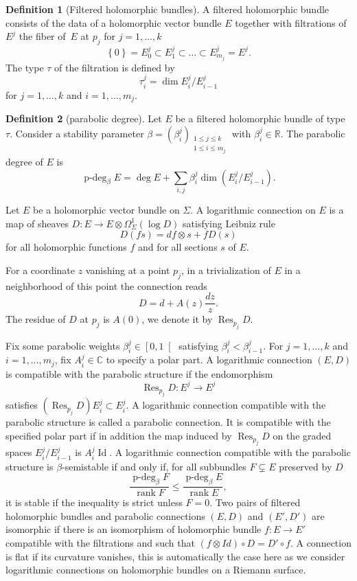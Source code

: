 \documentclass[11pt]{article}
\theoremstyle{definition}
\newtheorem{definition}{Definition}[section]
\theoremstyle{plain}
\DeclareMathOperator{\Id}{Id}
\DeclareMathOperator{\Res}{Res}
\DeclareMathOperator{\rank}{rank}
\DeclareMathOperator{\pdeg}{p-deg}
\newcommand{\C}{\mathbb{C}}
\begin{document}
\begin{definition}[Filtered holomorphic bundles]
A filtered holomorphic bundle consists of the data of a holomorphic vector bundle $E$ together with filtrations of $E^j$ the fiber of~$E$ at $p_j$ for $j=1,\dots,k$
\[
\left\lbrace 0\right \rbrace = E^j_0 \subset E^j_1\subset\dots\subset E^j_{m_j} = E^j.
\]
The type $\tau$ of the filtration is defined by
\[
\tau^j_i =\dim E^j_i/E^j_{i-1}
\]
for $j=1,\dots,k$ and $i=1,\dots,m_j$.
\end{definition}
\begin{definition}[parabolic degree]
Let $E$ be a filtered holomorphic bundle of type~$\tau$. Consider a stability parameter $\beta=(\beta^j_i)_{\substack{1\le j \le k \\ 1 \le i \le m_j}}$ with $\beta_i^j\in\mathbb{R}$. The parabolic degree of $E$ is
\[
\pdeg_{\beta} E =\deg E + \sum_{i,j} \beta^j_i \dim(E^j_i/E^j_{i-1}).
\]
\end{definition}

Let $E$ be a holomorphic vector bundle on $\Sigma$. A logarithmic connection on $E$ is a map of sheaves $D: E\to E\otimes \Omega^1_{\Sigma}(\log D)$ satisfying Leibniz rule
\[
D(f s) = df\otimes s + f D(s)
\]
for all holomorphic functions $f$ and for all sections $s$ of $E$.

For a coordinate $z$ vanishing at a point $p_j$, in a trivialization of $E$ in a neighborhood of this point the connection reads
\[
D = d + A(z) \frac{d z}{z}.
\]
The residue of $D$ at $p_j$ is $A(0)$, we denote it by $\Res_{p_j} D$.

Fix some parabolic weights $\beta^j_i\in \left[ 0, 1\right[$ satisfying $\beta^j_i < \beta^j_{i-1}$. For $j=1,\dots, k$ and $i=1,\dots,m_j$, fix $A^j_i \in \C$ to specify a polar part. A logarithmic connection $(E,D)$ is compatible with the parabolic structure if the endomorphism
\[
\Res_{p_j} D : E^j \to E^j
\]
satisfies $\left(\Res_{p_j} D\right) E^j_i \subset E^j_{i}$. A logarithmic connection compatible with the parabolic structure is called a parabolic connection. It is compatible with the specified polar part if in addition the map induced by $\Res_{p_j} D$ on the graded spaces $ E^j_i/E^j_{i-1} $ is $A^j_i \Id$.
A logarithmic connection compatible with the parabolic structure is $\beta$-semistable if and only if, for all subbundles $F\subsetneq E$ preserved by $D$
\[
\frac{\pdeg_{\beta} F}{\rank F} \le \frac{\pdeg_{\beta} E}{\rank E},
\]
it is stable if the inequality is strict unless $F=0$. Two pairs of filtered holomorphic bundles and parabolic connections $(E,D)$ and $(E',D')$ are isomorphic if there is an isomorphism of holomorphic bundle $f:E\to E'$ compatible with the filtrations and such that $\left(f\otimes Id\right)\circ D = D'\circ f$. A connection is flat if its curvature vanishes, this is automatically the case here as we consider logarithmic connections on holomorphic bundles on a Riemann surface.
\end{document}
